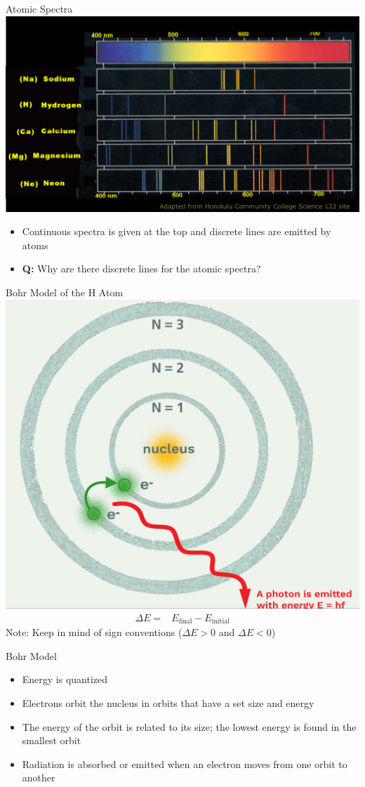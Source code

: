 \documentclass[11pt]{beamer}
\begin{document}
\begin{frame}{Atomic Spectra}
  \centering
  \includegraphics[width=0.85\linewidth]{cont_line}
  \begin{itemize}
  \item Continuous spectra is given at the top and
    discrete lines are emitted by atoms
  \item \textbf{Q:} Why are there discrete lines for
    the atomic spectra?
  \end{itemize}
\end{frame}

\begin{frame}{Bohr Model of the H Atom}
  \centering
  \includegraphics[width=0.55\linewidth]{bohr_model}
  \begin{align}
    \Delta E = & E_\text{final} - E_\text{initial}
  \end{align}
  Note: Keep in mind of sign conventions ($\Delta E > 0$ and
  $\Delta E < 0$)
\end{frame}

\begin{frame}{Bohr Model}
  \begin{itemize}
  \item Energy is quantized
  \item Electrons orbit the nucleus in orbits that have
    a set size and energy
  \item The energy of the orbit is related to its size; the
    lowest energy is found in the smallest orbit
  \item Radiation is absorbed or emitted when an electron
    moves from one orbit to another
  \end{itemize}
\end{frame}
\end{document}
